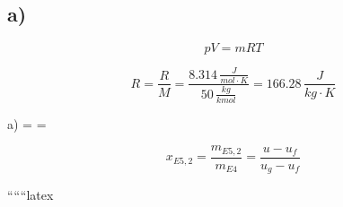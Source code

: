 

\subsection*{a)}
\begin{equation*}
pV = mRT
\end{equation*}

\begin{equation*}
R = \frac{R}{M} = \frac{8.314 \, \frac{J}{mol \cdot K}}{50 \, \frac{kg}{kmol}} = 166.28 \, \frac{J}{kg \cdot K}
\end{equation*}

a) \quad {} =  \quad \Rightarrow \quad {} = 

\[
x_{E5,2} = \frac{m_{E5,2}}{m_{E4}} = \frac{u - u_f}{u_g - u_f}
\]

``````latex